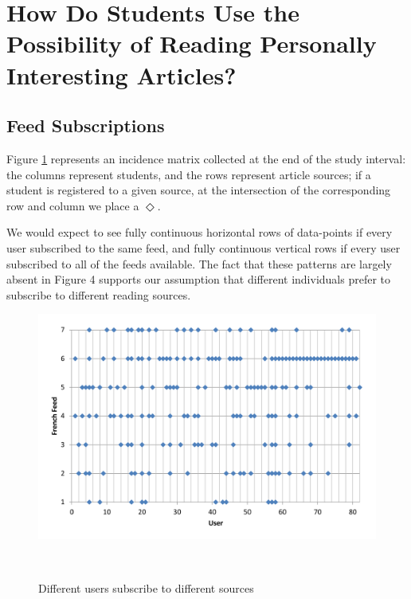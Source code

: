 
\newpage
\section{How Do Students Use the Possibility of Reading Personally Interesting Articles?}
\label{sec:results}

\subsection {Feed Subscriptions}
Figure \ref{fig:registrations} represents an incidence matrix collected at the end of the study interval: the columns represent students, and the rows represent article sources; if a student is registered to a given source, at the intersection of the corresponding row and column we place a $\Diamond$. 

We would expect to see fully continuous horizontal rows of data-points if every user subscribed to the same feed, and fully continuous vertical rows if every user subscribed to all of the feeds available. The fact that these patterns are largely absent in Figure 4 supports our assumption that different individuals prefer to subscribe to different reading sources.


\begin{figure}[h!]
\centering
  \includegraphics[width=\columnwidth]{figures/users_feeds}
  \caption{Different users subscribe to different sources}~\label{fig:registrations}
\end{figure}

